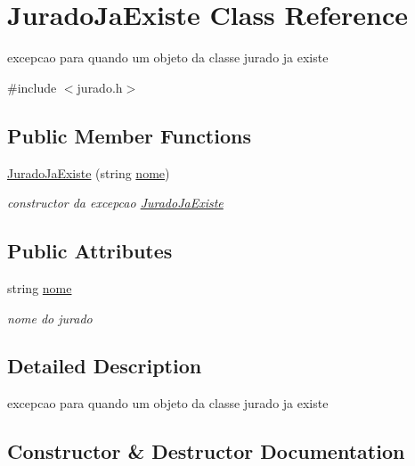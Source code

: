 \hypertarget{classJuradoJaExiste}{}\section{Jurado\+Ja\+Existe Class Reference}
\label{classJuradoJaExiste}


excepcao para quando um objeto da classe jurado ja existe  




{\ttfamily \#include $<$jurado.\+h$>$}

\subsection*{Public Member Functions}
\begin{DoxyCompactItemize}
\item 
\hyperlink{classJuradoJaExiste_a079c17599ccb15515eadac4af3d07cf4}{Jurado\+Ja\+Existe} (string \hyperlink{classJuradoJaExiste_a3f471f626f78a0c2d57b7e1f445c300e}{nome})
\begin{DoxyCompactList}\small\item\em constructor da excepcao \hyperlink{classJuradoJaExiste}{Jurado\+Ja\+Existe} \end{DoxyCompactList}\end{DoxyCompactItemize}
\subsection*{Public Attributes}
\begin{DoxyCompactItemize}
\item 
string \hyperlink{classJuradoJaExiste_a3f471f626f78a0c2d57b7e1f445c300e}{nome}
\begin{DoxyCompactList}\small\item\em nome do jurado \end{DoxyCompactList}\end{DoxyCompactItemize}


\subsection{Detailed Description}
excepcao para quando um objeto da classe jurado ja existe 

\subsection{Constructor \& Destructor Documentation}
